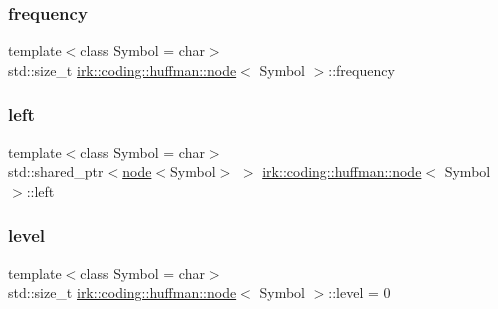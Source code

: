 \subsubsection{\texorpdfstring{frequency}{frequency}}
{\footnotesize\ttfamily template$<$class Symbol = char$>$ \\
std\+::size\+\_\+t \mbox{\hyperlink{structirk_1_1coding_1_1huffman_1_1node}{irk\+::coding\+::huffman\+::node}}$<$ Symbol $>$\+::frequency}

\mbox{\label{structirk_1_1coding_1_1huffman_1_1node_ac4303bd6570125c1d18506a8596f3b8f}} 
\subsubsection{\texorpdfstring{left}{left}}
{\footnotesize\ttfamily template$<$class Symbol = char$>$ \\
std\+::shared\+\_\+ptr$<$\mbox{\hyperlink{structirk_1_1coding_1_1huffman_1_1node}{node}}$<$Symbol$>$ $>$ \mbox{\hyperlink{structirk_1_1coding_1_1huffman_1_1node}{irk\+::coding\+::huffman\+::node}}$<$ Symbol $>$\+::left}

\mbox{\label{structirk_1_1coding_1_1huffman_1_1node_ae34639865753731eb74aaae1244442e7}} 
\subsubsection{\texorpdfstring{level}{level}}
{\footnotesize\ttfamily template$<$class Symbol = char$>$ \\
std\+::size\+\_\+t \mbox{\hyperlink{structirk_1_1coding_1_1huffman_1_1node}{irk\+::coding\+::huffman\+::node}}$<$ Symbol $>$\+::level = 0}

\mbox{\label{structirk_1_1coding_1_1huffman_1_1node_addc238c8601bb721a25a5750f6c33ebd}} 
